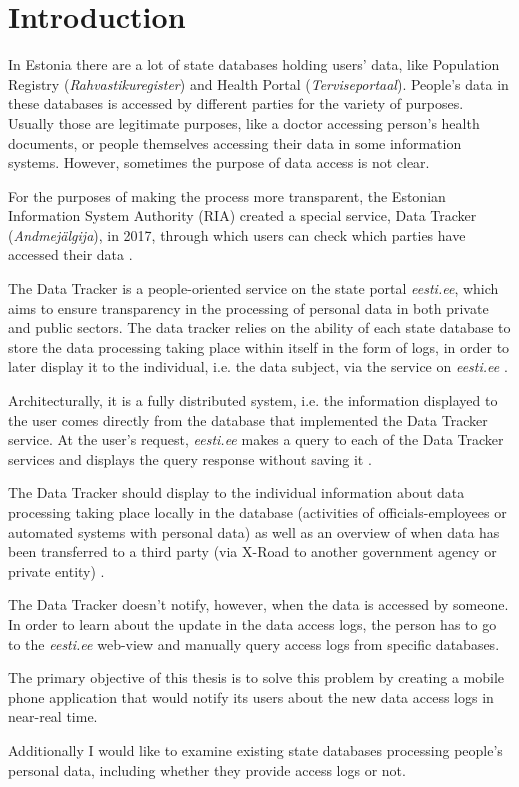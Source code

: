 \section{Introduction} \label{Introduction}

In Estonia there are a lot of state databases holding users' data, like Population Registry (\textit{Rahvastikuregister}) and Health Portal (\textit{Terviseportaal}). People's data in these databases is accessed by different parties for the variety of purposes. Usually those are legitimate purposes, like a doctor accessing person's health documents, or people themselves accessing their data in some information systems. However, sometimes the purpose of data access is not clear.

For the purposes of making the process more transparent, the Estonian Information System Authority (RIA) created a special service, Data Tracker (\textit{Andmejälgija}), in 2017, through which users can check which parties have accessed their data \cite{err-population-registry-unauthorized-access}. 

The Data Tracker is a people-oriented service on the state portal \textit{eesti.ee}, which aims to ensure transparency in the processing of personal data in both private and public sectors. The data tracker relies on the ability of each state database to store the data processing taking place within itself in the form of logs, in order to later display it to the individual, i.e. the data subject, via the service on \textit{eesti.ee} \cite{aj-github}.

Architecturally, it is a fully distributed system, i.e. the information displayed to the user comes directly from the database that implemented the Data Tracker service. At the user's request, \textit{eesti.ee} makes a query to each of the Data Tracker services and displays the query response without saving it \cite{aj-github}.

The Data Tracker should display to the individual information about data processing taking place locally in the database (activities of officials-employees or automated systems with personal data) as well as an overview of when data has been transferred to a third party (via X-Road to another government agency or private entity) \cite{aj-github}.

The Data Tracker doesn't notify, however, when the data is accessed by someone. In order to learn about the update in the data access logs, the person has to go to the \textit{eesti.ee} web-view and manually query access logs from specific databases. 

The primary objective of this thesis is to solve this problem by creating a mobile phone application that would notify its users about the new data access logs in near-real time. 

Additionally I would like to examine existing state databases processing people's personal data, including whether they provide access logs or not.